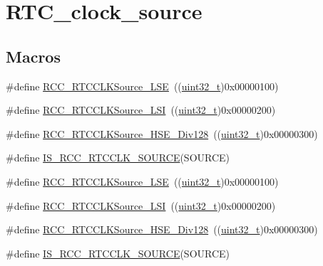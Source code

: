 \hypertarget{group___r_t_c__clock__source}{}\section{R\+T\+C\+\_\+clock\+\_\+source}
\label{group___r_t_c__clock__source}
\subsection*{Macros}
\begin{DoxyCompactItemize}
\item 
\#define \hyperlink{group___r_t_c__clock__source_ga18c0c40ff4289148c9fa44c6848d5552}{R\+C\+C\+\_\+\+R\+T\+C\+C\+L\+K\+Source\+\_\+\+L\+SE}~((\hyperlink{_p_e___types_8h_a33594304e786b158f3fb30289278f5af}{uint32\+\_\+t})0x00000100)
\item 
\#define \hyperlink{group___r_t_c__clock__source_ga7758c87e4584bfa76cb99c726b7162c3}{R\+C\+C\+\_\+\+R\+T\+C\+C\+L\+K\+Source\+\_\+\+L\+SI}~((\hyperlink{_p_e___types_8h_a33594304e786b158f3fb30289278f5af}{uint32\+\_\+t})0x00000200)
\item 
\#define \hyperlink{group___r_t_c__clock__source_gada0bedcd0afa5104ec0ef398d1ac2778}{R\+C\+C\+\_\+\+R\+T\+C\+C\+L\+K\+Source\+\_\+\+H\+S\+E\+\_\+\+Div128}~((\hyperlink{_p_e___types_8h_a33594304e786b158f3fb30289278f5af}{uint32\+\_\+t})0x00000300)
\item 
\#define \hyperlink{group___r_t_c__clock__source_gae76a0340b02b5342e756fa0d2112ebf5}{I\+S\+\_\+\+R\+C\+C\+\_\+\+R\+T\+C\+C\+L\+K\+\_\+\+S\+O\+U\+R\+CE}(S\+O\+U\+R\+CE)
\item 
\#define \hyperlink{group___r_t_c__clock__source_ga18c0c40ff4289148c9fa44c6848d5552}{R\+C\+C\+\_\+\+R\+T\+C\+C\+L\+K\+Source\+\_\+\+L\+SE}~((\hyperlink{_p_e___types_8h_a33594304e786b158f3fb30289278f5af}{uint32\+\_\+t})0x00000100)
\item 
\#define \hyperlink{group___r_t_c__clock__source_ga7758c87e4584bfa76cb99c726b7162c3}{R\+C\+C\+\_\+\+R\+T\+C\+C\+L\+K\+Source\+\_\+\+L\+SI}~((\hyperlink{_p_e___types_8h_a33594304e786b158f3fb30289278f5af}{uint32\+\_\+t})0x00000200)
\item 
\#define \hyperlink{group___r_t_c__clock__source_gada0bedcd0afa5104ec0ef398d1ac2778}{R\+C\+C\+\_\+\+R\+T\+C\+C\+L\+K\+Source\+\_\+\+H\+S\+E\+\_\+\+Div128}~((\hyperlink{_p_e___types_8h_a33594304e786b158f3fb30289278f5af}{uint32\+\_\+t})0x00000300)
\item 
\#define \hyperlink{group___r_t_c__clock__source_gae76a0340b02b5342e756fa0d2112ebf5}{I\+S\+\_\+\+R\+C\+C\+\_\+\+R\+T\+C\+C\+L\+K\+\_\+\+S\+O\+U\+R\+CE}(S\+O\+U\+R\+CE)
\end{DoxyCompactItemize}


